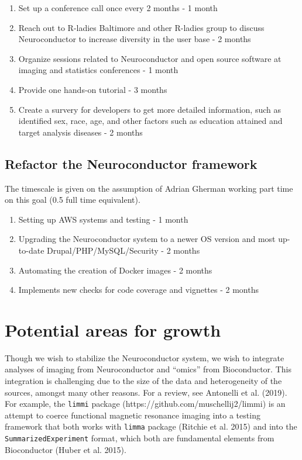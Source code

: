 \documentclass[]{elsarticle} %
\providecommand{\tightlist}{%
  \setlength{\itemsep}{0pt}\setlength{\parskip}{0pt}}
\begin{document}
\begin{enumerate}
\def\labelenumi{\arabic{enumi}.}
\tightlist
\item
  Set up a conference call once every 2 months - 1 month
\item
  Reach out to R-ladies Baltimore and other R-ladies group to discuss
  Neuroconductor to increase diversity in the user base - 2 months
\item
  Organize sessions related to Neuroconductor and open source software
  at imaging and statistics conferences - 1 month
\item
  Provide one hands-on tutorial - 3 months
\item
  Create a survery for developers to get more detailed information, such
  as identified sex, race, age, and other factors such as education
  attained and target analysis diseases - 2 months
\end{enumerate}

\subsection{Refactor the Neuroconductor
framework}\label{refactor-the-neuroconductor-framework-1}

The timescale is given on the assumption of Adrian Gherman working part
time on this goal (0.5 full time equivalent).

\begin{enumerate}
\def\labelenumi{\arabic{enumi}.}
\tightlist
\item
  Setting up AWS systems and testing - 1 month
\item
  Upgrading the Neuroconductor system to a newer OS version and most
  up-to-date Drupal/PHP/MySQL/Security - 2 months
\item
  Automating the creation of Docker images - 2 months
\item
  Implements new checks for code coverage and vignettes - 2 months
\end{enumerate}

\section{Potential areas for growth}\label{potential-areas-for-growth}

Though we wish to stabilize the Neuroconductor system, we wish to
integrate analyses of imaging from Neuroconductor and ``omics'' from
Bioconductor. This integration is challenging due to the size of the
data and heterogeneity of the sources, amongst many other reasons. For a
review, see Antonelli et al. (2019). For example, the \texttt{limmi}
package (https://github.com/muschellij2/limmi) is an attempt to coerce
functional magnetic resonance imaging into a testing framework that both
works with \texttt{limma} package (Ritchie et al. 2015) and into the
\texttt{SummarizedExperiment} format, which both are fundamental
elements from Bioconductor (Huber et al. 2015).
\end{document}
